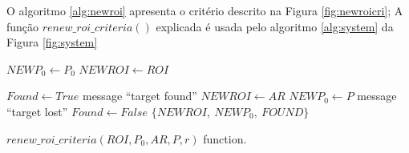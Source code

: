 O algoritmo \ref{alg:newroi} apresenta o critério descrito na Figura \ref{fig:newroicri};
A função $renew\_roi\_criteria()$ explicada é usada pelo algoritmo \ref{alg:system} da Figura \ref{fig:system}


\begin{algorithm}

    $NEWP_0 \leftarrow  P_0$ \;
    $NEWROI \leftarrow  ROI$ \;
    
    {
      $Found \leftarrow True$\;
        message ``target found''\;
        {
            $NEWROI \leftarrow  AR$\;
            $NEWP_0 \leftarrow  P$\;
        }
    }
    {
      message ``target lost''\;
      $Found \leftarrow False$\;
    }
\Return  $\{NEWROI,~NEWP_0,~FOUND\}$\;
\label{alg:newroi}
\caption{$renew\_roi\_criteria(ROI,P_0,AR,P,r)$ function.}
\end{algorithm}

